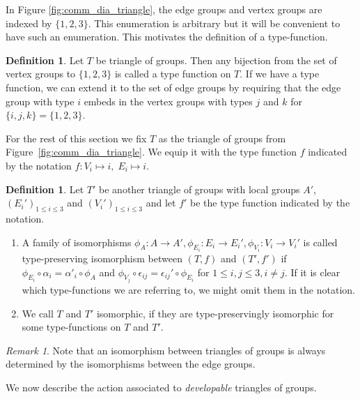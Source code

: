 \documentclass[dvipsnames]{article}
\theoremstyle{definition}
\newtheorem{definition}[theorem]{Definition}
\theoremstyle{remark}
\newtheorem{remark}[theorem]{Remark}
\begin{document}
    In Figure \ref{fig:comm_dia_triangle}, the edge groups and vertex groups are indexed by $\{1,2,3\}$. This enumeration is arbitrary but it will be convenient to have such an enumeration. This motivates the definition of a type-function.

    \begin{definition}
        Let $T$ be triangle of groups. Then any bijection from the set of vertex groups to $\{1,2,3\}$ is called a type function on $T$. If we have a type function, we can extend it to the set of edge groups by requiring that the edge group with type $i$ embeds in the vertex groups with types $j$ and $k$ for $\{i,j,k\} = \{1,2,3\}$.
    \end{definition}

    For the rest of this section we fix $T$ as the triangle of groups from Figure~\ref{fig:comm_dia_triangle}. We equip it with the type function $f$ indicated by the notation ${f:V_i \mapsto i}, {\; E_i\mapsto i}$.
    
    \begin{definition}
        Let $T'$ be another triangle of groups with local groups $A'$, $(E_i')_{1\leq i \leq 3}$ and $(V_i')_{1\leq i \leq 3}$ and let $f'$ be the type function indicated by the notation.
        \begin{enumerate}
            \item A family of isomorphisms $\phi_A : A \to A', \phi_{E_i} : E_i \to E_i', \phi_{V_i} : V_i \to V_i'$ is called type-preserving isomorphism between $(T, f)$ and $(T', f')$ if $\phi_{E_i}\circ \alpha_i=\alpha'_i \circ \phi_{A}$ and $\phi_{V_j} \circ \epsilon_{ij} = \epsilon_{ij}' \circ \phi_{E_i}$ for $1\leq i, j \leq 3, i\neq j$. If it is clear which type-functions we are referring to, we might omit them in the notation.
            \item
            We call $T$ and $T'$ isomorphic, if they are type-preservingly isomorphic for some type-functions on $T$ and $T'$.
        \end{enumerate}
    \end{definition}

    \begin{remark}
        Note that an isomorphism between triangles of groups is always determined by the isomorphisms between the edge groups.
    \end{remark}

    We now describe the action associated to \textit{developable} triangles of groups.
        
\end{document}
